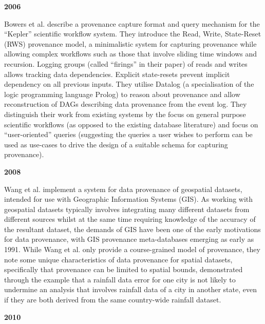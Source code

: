 \textbf{2006}

Bowers et al. \cite{Bowers2006} describe a provenance capture format and query mechanism for the ``Kepler'' scientific workflow system. They introduce the Read, Write, State-Reset (RWS) provenance model, a minimalistic system for capturing provenance while allowing complex workflows such as those that involve sliding time windows and recursion. Logging groups (called ``firings'' in their paper) of reads and writes allows tracking data dependencies. Explicit state-resets prevent implicit dependency on all previous inputs. They utilise Datalog (a specialisation of the logic programming language Prolog) to reason about provenance and allow reconstruction of DAGs describing data provenance from the event log. They distinguish their work from existing systems by the focus on general purpose scientific workflows (as opposed to the existing database literature) and focus on ``user-oriented'' queries (suggesting the queries a user wishes to perform can be used as use-cases to drive the design of a suitable schema for capturing provenance). %

\textbf{2008}

Wang et al. \cite{Wang2008} implement a system for data provenance of geospatial datasets, intended for use with Geographic Information Systems (GIS). As working with geospatial datasets typically involves integrating many different datasets from different sources whilst at the same time requiring knowledge of the accuracy of the resultant dataset, the demands of GIS have been one of the early motivations for data provenance, with GIS provenance meta-databases emerging as early as 1991. While Wang et al. only provide a course-grained model of provenance, they note some unique characteristics of data provenance for spatial datasets, specifically that provenance can be limited to spatial bounds, demonstrated through the example that a rainfall data error for one city is not likely to undermine an analysis that involves rainfall data of a city in another state, even if they are both derived from the same country-wide rainfall dataset.


\textbf{2010}

